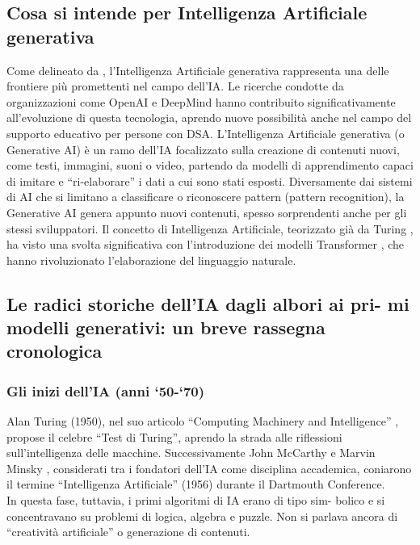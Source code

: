 \documentclass[14pt]{extbook}
\begin{document}
\subsection{Cosa si intende per Intelligenza Artificiale generativa}
Come delineato da \cite{russell2021artificial}, l'Intelligenza Artificiale generativa rappresenta una delle frontiere più promettenti nel campo dell'IA. Le ricerche condotte da organizzazioni come OpenAI \cite{openai2024research} e DeepMind \cite{deepmind2024research} hanno contribuito significativamente all'evoluzione di questa tecnologia, aprendo nuove possibilità anche nel campo del supporto educativo per persone con DSA. L’Intelligenza Artificiale generativa (o Generative AI) è un ramo dell’IA focalizzato sulla creazione di contenuti nuovi, come testi, immagini, suoni o video, partendo da modelli di apprendimento capaci di imitare e “ri-elaborare” i dati a cui sono stati esposti. Diversamente dai sistemi di AI che si limitano a classificare o riconoscere pattern (pattern recognition), la Generative AI genera appunto nuovi contenuti, spesso sorprendenti anche per gli stessi sviluppatori. Il concetto di Intelligenza Artificiale, teorizzato già da Turing \cite{turing1950computing}, ha visto una svolta significativa con l'introduzione dei modelli Transformer \cite{vaswani2017attention}, che hanno rivoluzionato l'elaborazione del linguaggio naturale. \\
\subsection{Le radici storiche dell’IA dagli albori ai pri- mi modelli generativi: un breve rassegna cronologica}
\subsubsection{Gli inizi dell’IA (anni ‘50-‘70)}
Alan Turing (1950), nel suo articolo “Computing Machinery and Intelligence” \cite{turing1950computing}, propose il celebre “Test di Turing”, aprendo la strada alle riflessioni sull’intelligenza delle macchine. Successivamente John McCarthy e Marvin Minsky \cite{mccarthy1955proposal}, considerati tra i fondatori dell’IA come disciplina accademica, coniarono il termine “Intelligenza Artificiale” (1956) durante il Dartmouth Conference. \\
In questa fase, tuttavia, i primi algoritmi di IA erano di tipo sim- bolico e si concentravano su problemi di logica, algebra e puzzle. Non si parlava ancora di “creatività artificiale” o generazione di contenuti.\\
\end{document}
